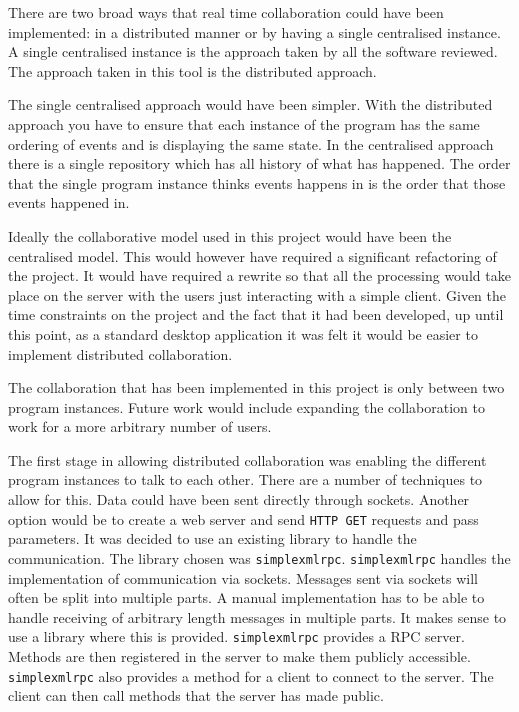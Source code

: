There are two broad ways that real time collaboration could have been implemented: in a distributed manner or by having a single centralised instance.  A single centralised instance is the approach taken by all the software reviewed.  The approach taken in this tool is the distributed approach.

The single centralised approach would have been simpler.  With the distributed approach you have to ensure that each instance of the program has the same ordering of events and is displaying the same state.  In the centralised approach there is a single repository which has all history of what has happened.  The order that the single program instance thinks events happens in is the order that those events happened in.

Ideally the collaborative model used in this project would have been the centralised model.  This would however have required a significant refactoring of the project.  It would have required a rewrite so that all the processing would take place on the server with the users just interacting with a simple client.  Given the time constraints on the project and the fact that it had been developed, up until this point, as a standard desktop application it was felt it would be easier to implement distributed collaboration.

The collaboration that has been implemented in this project is only between two program instances.  Future work would include expanding the collaboration to work for a more arbitrary number of users.

The first stage in allowing distributed collaboration was enabling the different program instances to talk to each other. There are a number of techniques to allow for this.  Data could have been sent directly through sockets. Another option would be to create a web server and send \texttt{HTTP GET} requests and pass parameters.  It was decided to use an existing library to handle the communication.  The library chosen was \texttt{simplexmlrpc}.  \texttt{simplexmlrpc} handles the implementation of communication via sockets.  Messages sent via sockets will often be split into multiple parts.  A manual implementation has to be able to handle receiving of arbitrary length messages in multiple parts.  It makes sense to use a library where this is provided.  \texttt{simplexmlrpc} provides a \ac{RPC} server.  Methods are then registered in the server to make them publicly accessible.  \texttt{simplexmlrpc} also provides a method for a client to connect to the server.  The client can then call methods that the server has made public.

